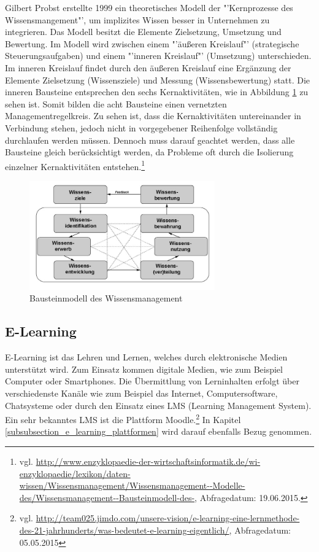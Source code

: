 Gilbert Probst erstellte 1999 ein theoretisches Modell der "'Kernprozesse des Wissensmangement"', um implizites Wissen besser in Unternehmen zu integrieren. Das Modell besitzt die Elemente Zielsetzung, Umsetzung und Bewertung. Im Modell wird zwischen einem "'äußeren Kreislauf"' (strategische Steuerungsaufgaben) und einem "'inneren Kreislauf"' (Umsetzung) unterschieden. Im inneren Kreislauf findet durch den äußeren Kreislauf eine Ergänzung der Elemente Zielsetzung (Wissensziele) und Messung (Wissensbewertung) statt. Die inneren Bausteine entsprechen den sechs Kernaktivitäten, wie in Abbildung \ref{fig_wissensmanagament_probst} zu sehen ist. Somit bilden die acht Bausteine einen vernetzten Managementregelkreis. Zu sehen ist, dass die Kernaktivitäten untereinander in Verbindung stehen, jedoch nicht in vorgegebener Reihenfolge vollständig durchlaufen werden müssen. Dennoch muss darauf geachtet werden, dass alle Bausteine gleich berücksichtigt werden, da Probleme oft durch die Isolierung einzelner Kernaktivitäten entstehen.\footnote{vgl. \url{http://www.enzyklopaedie-der-wirtschaftsinformatik.de/wi-enzyklopaedie/lexikon/daten-wissen/Wissensmanagement/Wissensmanagement--Modelle-des/Wissensmanagement--Bausteinmodell-des-}, Abfragedatum: 19.06.2015.} 

\begin{figure}[h!]
	\centering
	\includegraphics[width=8cm]{kapitel/gruppe2/bilder/wissensmanagament_probst}
	\caption{ Bausteinmodell des Wissensmanagement \protect\footnotemark}
	\label{fig_wissensmanagament_probst}
\end{figure}

\subsection{E-Learning}
E-Learning ist das Lehren und Lernen, welches durch elektronische Medien unterstützt wird. Zum Einsatz kommen digitale Medien, wie zum Beispiel Computer oder Smartphones. Die Übermittlung von Lerninhalten erfolgt über verschiedenste Kanäle wie zum Beispiel das Internet, Computersoftware, Chatsysteme oder durch den Einsatz eines LMS (Learning Management System). Ein sehr bekanntes LMS ist die Plattform Moodle.\footnote{vgl. \url{http://team025.jimdo.com/unsere-vision/e-learning-eine-lernmethode-des-21-jahrhunderts/was-bedeutet-e-learning-eigentlich/}, Abfragedatum: 05.05.2015} In Kapitel \ref{subsubsection_e_learning_plattformen} wird darauf ebenfalls Bezug genommen.


